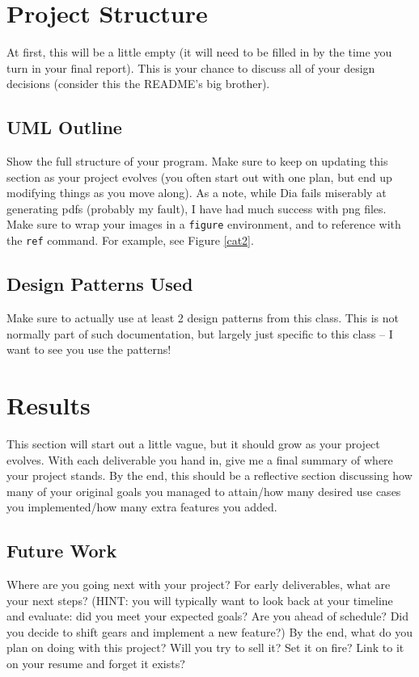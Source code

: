 \documentclass[10pt,conference,onecolumn,compsoc]{IEEEtran}
\begin{document}
\section{Project Structure}
At first, this will be a little empty (it will need to be filled in by the time you turn in your final report).  This is your chance to discuss all of your design decisions (consider this the README's big brother).

\subsection{UML Outline}
Show the full structure of your program.  Make sure to keep on updating this section as your project evolves (you often start out with one plan, but end up modifying things as you move along).  As a note, while Dia fails miserably at generating pdfs (probably my fault), I have had much success with png files.  Make sure to wrap your images in a \texttt{figure} environment, and to reference with the \texttt{ref} command.  For example, see Figure \ref{cat2}.



\subsection{Design Patterns Used}
Make sure to actually use at least 2 design patterns from this class.  This is not normally part of such documentation, but largely just specific to this class -- I want to see you use the patterns!


\section{Results}
This section will start out a little vague, but it should grow as your project evolves.  With each deliverable you hand in, give me a final summary of where your project stands.  By the end, this should be a reflective section discussing how many of your original goals you managed to attain/how many desired use cases you implemented/how many extra features you added.

\subsection{Future Work}
Where are you going next with your project?
For early deliverables, what are your next steps?  (HINT: you will typically want to look back at your timeline and evaluate: did you meet your expected goals?  Are you ahead of schedule?  Did you decide to shift gears and implement a new feature?)
By the end, what do you plan on doing with this project?  Will you try to sell it?  Set it on fire?  Link to it on your resume and forget it exists?
\end{document}
